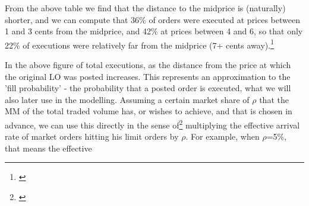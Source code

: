 \documentclass[12pt,a4paper]{cau_thesis}
\begin{document}
\begin{figure}[htbp]
    \vspace*{0.5cm}
    \centering
    \label{fig:messages_by_dist_to_mid}
\end{figure}
From the above table we find that the distance to the midprice is
(naturally) shorter, and we can compute that 36\% of orders were
executed at prices between 1 and 3 cents from the midprice, and 42\%
at prices between 4 and 6, so that only 22\% of executions were
relatively far from the midprice (7+ cents away).\footnote{\cite[See
    ][, p.93]{cartea2015algorithmic}}
\begin{figure}[htbp]
    \vspace*{0.5cm}
    \centering
    \label{fig:surv_func_dist_from_mid}
\end{figure}
In the above figure of total executions, as the distance from the
price at which the original LO was posted increases. This represents
an approximation to the 'fill probability' - the probability that a
posted order is executed, what we will also later use in the
modelling. Assuming a certain market share of $\rho$ that the MM of
the total traded volume has, or wishes to achieve, and that is chosen
in advance, we can use this directly in the sense
of\footnote{\cite[See ][, p.9]{law2015pure}} multiplying the
effective arrival rate of market orders hitting his limit orders by
$\rho$. For example, when $\rho$=5\%, that means the effective
\end{document}
